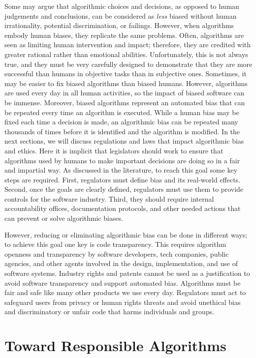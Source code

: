 Some may argue that algorithmic choices and decisions, as opposed to human judgements and conclusions, can be considered as \textit{less} biased without human irrationality, potential discrimination, or failings. However, when algorithms embody human biases, they replicate the same problems. Often, algorithms are seen as limiting human intervention and impact; therefore, they are credited with greater rational rather than emotional abilities. Unfortunately, this is not always true, and they must be very carefully designed to demonstrate that they are more successful than humans in objective tasks than in subjective ones. Sometimes, it may be easier to fix biased algorithms than biased humans. However, algorithms are used every day in all human activities, so the impact of biased software can be immense. Moreover, biased algorithms represent an automated bias that can be repeated every time an algorithm is executed. While a human bias may be fixed each time a decision is made, an algorithmic bias can be repeated many thousands of times before it is identified and the algorithm is modified. In the next sections, we will discuss regulations and laws that impact algorithmic bias and ethics. Here it is implicit that legislators should work to ensure that algorithms used by humans to make important decisions are doing so in a fair and impartial way. As discussed in the literature, to reach this goal some key steps are required. First, regulators must define bias and its real-world effects. Second, once the goals are clearly defined, regulators must use them to provide controls for the software industry. Third, they should require internal accountability offices, documentation protocols, and other needed actions that can prevent or solve algorithmic biases.

However, reducing or eliminating algorithmic bias can be done in different ways; to achieve this goal one key is code transparency. This requires algorithm openness and transparency by software developers, tech companies, public agencies, and other agents involved in the design, implementation, and use of software systems. Industry rights and patents cannot be used as a justification to avoid software transparency and support automated bias. Algorithms must be fair and safe like many other products we use every day. Regulators must act to safeguard users from privacy or human rights threats and avoid unethical bias and discriminatory or unfair code that harms individuals and groups.

\section{\label{sec:7.4}Toward Responsible Algorithms}

